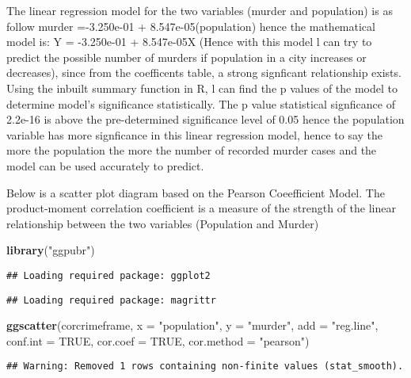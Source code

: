 \documentclass[]{article}
\newenvironment{Shaded}{\begin{snugshade}}{\end{snugshade}}
\newcommand{\KeywordTok}[1]{\textcolor[rgb]{0.13,0.29,0.53}{\textbf{#1}}}
\newcommand{\DataTypeTok}[1]{\textcolor[rgb]{0.13,0.29,0.53}{#1}}
\newcommand{\StringTok}[1]{\textcolor[rgb]{0.31,0.60,0.02}{#1}}
\newcommand{\OtherTok}[1]{\textcolor[rgb]{0.56,0.35,0.01}{#1}}
\newcommand{\NormalTok}[1]{#1}
\begin{document}
The linear regression model for the two variables (murder and
population) is as follow murder =-3.250e-01 + 8.547e-05(population)
hence the mathematical model is: Y = -3.250e-01 + 8.547e-05X (Hence with
this model l can try to predict the possible number of murders if
population in a city increases or decreases), since from the coefficents
table, a strong signficant relationship exists. Using the inbuilt
summary function in R, l can find the p values of the model to determine
model's significance statistically. The p value statistical signficance
of 2.2e-16 is above the pre-determined significance level of 0.05 hence
the population variable has more signficance in this linear regression
model, hence to say the more the population the more the number of
recorded murder cases and the model can be used accurately to predict.

Below is a scatter plot diagram based on the Pearson Coeefficient Model.
The product-moment correlation coefficient is a measure of the strength
of the linear relationship between the two variables (Population and
Murder)

\begin{Shaded}
\begin{Highlighting}[]
\KeywordTok{library}\NormalTok{(}\StringTok{"ggpubr"}\NormalTok{)}
\end{Highlighting}
\end{Shaded}

\begin{verbatim}
## Loading required package: ggplot2
\end{verbatim}

\begin{verbatim}
## Loading required package: magrittr
\end{verbatim}

\begin{Shaded}
\begin{Highlighting}[]
\KeywordTok{ggscatter}\NormalTok{(corcrimeframe, }\DataTypeTok{x =} \StringTok{"population"}\NormalTok{, }\DataTypeTok{y =} \StringTok{"murder"}\NormalTok{, }
          \DataTypeTok{add =} \StringTok{"reg.line"}\NormalTok{, }\DataTypeTok{conf.int =} \OtherTok{TRUE}\NormalTok{, }
          \DataTypeTok{cor.coef =} \OtherTok{TRUE}\NormalTok{, }\DataTypeTok{cor.method =} \StringTok{"pearson"}\NormalTok{)}
\end{Highlighting}
\end{Shaded}

\begin{verbatim}
## Warning: Removed 1 rows containing non-finite values (stat_smooth).
\end{verbatim}
\end{document}
